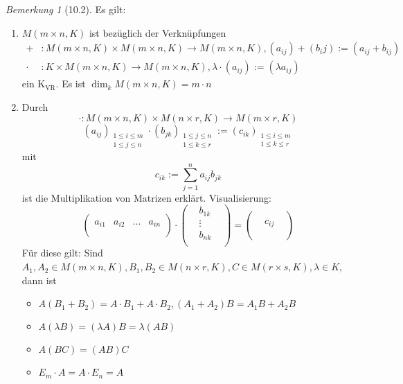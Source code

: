 \documentclass[a4paper]{scrartcl}
\theoremstyle{definition}
\theoremstyle{plain}
\theoremstyle{plain}
\theoremstyle{remark}
\newtheorem{remark}{Bemerkung}
\theoremstyle{remark}
\theoremstyle{remark}
\theoremstyle{remark}
\theoremstyle{remark}
\begin{document}
\begin{remark}[10.2]
Es gilt:
\begin{enumerate}
\item $M(m\times n, K)$ ist bezüglich der Verknüpfungen
\begin{align*}
+ &: M(m\times n, K) \times M(m\times n, K) \to M(m\times n, K), (a_{ij}) + (b_ij):= (a_{ij} + b_{ij}) \\
\cdot &:K\times M(m\times n, K) \to M(m\times n, K), \lambda \cdot (a_{ij}):=(\lambda a_{ij})
\end{align*}
ein K$_{\text{VR}}$. Es ist $\dim_k M(m\times n, K) = m\cdot n$
\item Durch
\[\cdot : M(m\times n, K) \times M(n\times r, K) \to M(m\times r, K)\]
\[(a_{ij})_{\substack{1\leq i \leq m \\ 1\leq j\leq n}} \cdot (b_{jk})_{\substack{1\leq j \leq n \\ 1\leq k \leq r}} := (c_{ik})_{\substack{1\leq i \leq m \\ 1\leq k \leq r}}\]
mit
\[c_{ik} := \sum_{j = 1}^{n}a_{ij} b_{jk}\]
ist die Multiplikation von Matrizen erklärt. Visualisierung:
\begin{equation}
\begin{pmatrix}
\\
a_{i1} & a_{i2} & \ldots & a_{in} \\
\\
\end{pmatrix}
\cdot
\begin{pmatrix}
& b_{1k} & \\
& \vdots & \\
& b_{nk} & \\
\end{pmatrix}
=
\begin{pmatrix}
&  & \\
& c_{ij} & \\
&  & \\
\end{pmatrix}
\end{equation}
Für diese gilt: Sind $A_1, A_2 \in M(m\times n, K), B_1, B_2 \in M(n\times r, K), C\in M(r\times s, K), \lambda \in K$, dann ist
\begin{itemize}
\item $A(B_1 + B_2) = A\cdot B_1 + A \cdot B_2, (A_1 + A_2) B = A_1 B + A_2 B$
\item $A(\lambda B) = (\lambda A) B = \lambda (A B)$
\item $A(B C) = (AB) C$
\item $E_m \cdot A = A \cdot E_n = A$

\end{itemize}
\end{enumerate}
\end{remark}
\end{document}
